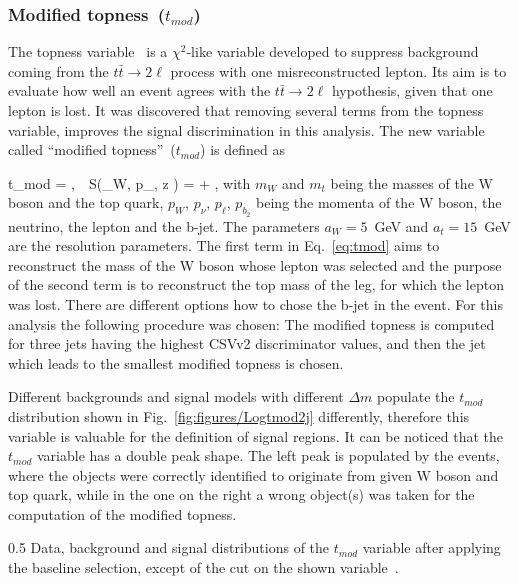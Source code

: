 \subsubsection{Modified topness~($t_{mod}$)}

The topness variable~\cite{Graesser:2012qy} is a $\chi^{2}$-like variable developed to suppress background coming from the $t \bar{t} \to 2\ell$ process with one misreconstructed lepton. Its aim is to evaluate how well an event agrees with the $t \bar{t} \to 2\ell$ hypothesis, given that one lepton is lost. It was discovered that removing several terms from the topness variable, improves the signal discrimination in this analysis. The new variable called ``modified topness''~($t_{mod}$) is defined as


{
 t_{mod} = ,~~S(_{W}, p_{\nu, z} ) =  + ,
}
with $m_{W}$ and  $m_{t}$ being the masses of the W boson and the top quark, ${p}_{W}$, ${p}_{\nu}$, ${p}_{\ell}$, ${p}_{b_{2}}$ being the momenta of the W boson, the neutrino, the lepton and the b-jet. The parameters $a_{W} =5$~GeV and $a_{t}=15$~GeV are the resolution parameters. The first term in Eq.~\ref{eq:tmod} aims to reconstruct the mass of the W boson whose lepton was selected and the purpose of the second term is to reconstruct the top mass of the leg, for which the lepton was lost. There are different options how to chose the  b-jet in the event. For this analysis the following procedure was chosen: The modified topness is computed for three jets having the highest CSVv2 discriminator values, and then the jet which leads to the smallest modified topness is chosen.

Different backgrounds and signal models with different $\Delta m$ populate the $t_{mod}$ distribution shown in Fig.~\ref{fig:figures/Logtmod2j} differently, therefore this variable is valuable for the definition of signal regions. It can be noticed that the $t_{mod}$ variable has a double peak shape. The left peak is populated by the events, where the objects were correctly identified to originate from given W boson and top quark, while in the one on the right a wrong object(s) was taken for the computation of the modified topness.

                 {0.5}       %
                 { Data, background and signal distributions of the $t_{mod}$ variable after applying the baseline selection, except of the cut on the shown variable~\cite{website:stopSupp}. }

